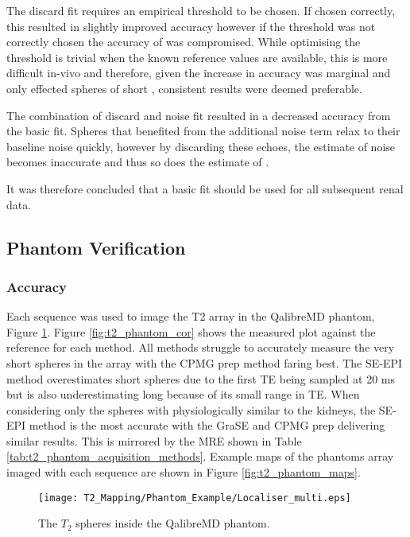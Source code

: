 The discard fit requires an empirical threshold to be chosen. If chosen correctly, this resulted in slightly improved accuracy however if the threshold was not correctly chosen the accuracy of \ttwo was compromised. While optimising the threshold is trivial when the known reference values are available, this is more difficult in-vivo and therefore, given the increase in accuracy was marginal and only effected spheres of short \ttwo, consistent results were deemed preferable.

The combination of discard and noise fit resulted in a decreased accuracy from the basic fit. Spheres that benefited from the additional noise term relax to their baseline noise quickly, however by discarding these echoes, the estimate of noise becomes inaccurate and thus so does the estimate of \ttwo.

It was therefore concluded that a basic fit should be used for all subsequent renal data.

\subsection{Phantom Verification}

\subsubsection{Accuracy}

Each sequence was used to image the T2 array in the QalibreMD phantom, Figure \ref{fig:t2_phantom_loc}. Figure \ref{fig:t2_phantom_cor} shows the measured \ttwo plot against the reference \ttwo for each method. All methods struggle to accurately measure the very short \ttwo spheres in the array with the \ac{CPMG} \ttwo prep method faring best. The \ac{SE}-\ac{EPI} method overestimates short \ttwo spheres due to the first \ac{TE} being sampled at 20 ms but is also underestimating long \ttwo because of its small range in \ac{TE}. When considering only the spheres with physiologically similar \ttwo to the kidneys, the \ac{SE}-\ac{EPI} method is the most accurate with the \ac{GraSE} and \ac{CPMG} \ttwo prep delivering similar results. This is mirrored by the \ac{MRE} shown in Table \ref{tab:t2_phantom_acquisition_methods}. Example \ttwo maps of the phantoms \ttwo array imaged with each sequence are shown in Figure \ref{fig:t2_phantom_maps}.

\begin{figure}[H]
	\centering
	\texttt{[image: T2\_Mapping/Phantom\_Example/Localiser\_multi.eps]}
	\caption{The $T_2$ spheres inside the QalibreMD phantom.}
	\label{fig:t2_phantom_loc}	
\end{figure}

